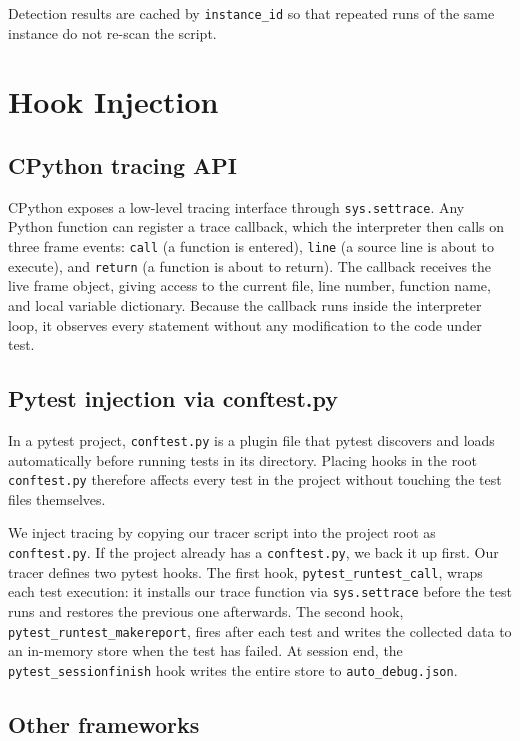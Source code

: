 Detection results are cached by \texttt{instance\_id} so that repeated runs of the same instance do not re-scan the script.


\section{Hook Injection}
\label{sec:hook-injection}

\subsection{CPython tracing API}

CPython exposes a low-level tracing interface through \texttt{sys.settrace}. Any Python function can register a trace callback, which the interpreter then calls on three frame events: \texttt{call} (a function is entered), \texttt{line} (a source line is about to execute), and \texttt{return} (a function is about to return). The callback receives the live frame object, giving access to the current file, line number, function name, and local variable dictionary. Because the callback runs inside the interpreter loop, it observes every statement without any modification to the code under test.

\subsection{Pytest injection via conftest.py}

In a pytest project, \texttt{conftest.py} is a plugin file that pytest discovers and loads automatically before running tests in its directory. Placing hooks in the root \texttt{conftest.py} therefore affects every test in the project without touching the test files themselves.

We inject tracing by copying our tracer script into the project root as \texttt{conftest.py}. If the project already has a \texttt{conftest.py}, we back it up first. Our tracer defines two pytest hooks. The first hook, \texttt{pytest\_runtest\_call}, wraps each test execution: it installs our trace function via \texttt{sys.settrace} before the test runs and restores the previous one afterwards. The second hook, \texttt{pytest\_runtest\_makereport}, fires after each test and writes the collected data to an in-memory store when the test has failed. At session end, the \texttt{pytest\_sessionfinish} hook writes the entire store to \texttt{auto\_debug.json}.

\subsection{Other frameworks}

